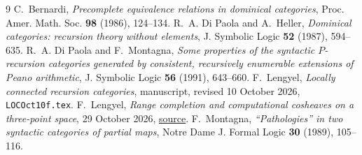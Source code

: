 \documentclass[11pt]{article}
\begin{document}
\begin{thebibliography}{9}
C.~Bernardi, \emph{Precomplete equivalence relations in dominical
categories}, Proc. Amer. Math. Soc. \textbf{98} (1986), 124--134.
R.~A. Di Paola and A.~Heller, \emph{Dominical categories:
recursion theory without elements}, J. Symbolic Logic
\textbf{52} (1987), 594--635.
R.~A. Di Paola and F.~Montagna, \emph{Some properties of the syntactic
$P$-recursion categories generated by consistent, recursively enumerable
extensions of Peano arithmetic}, J. Symbolic Logic \textbf{56} (1991),
643--660.
F.~Lengyel, \emph{Locally connected recursion categories}, manuscript,
revised 10 October 2026, \texttt{LOCOct10f.tex}.
F.~Lengyel, \emph{Range completion and computational cosheaves on a
three-point space}, 29 October 2026,
\href{https://github.com/flengyel/CategoricalEssentialIncompleteness/blob/3be65406b0bb6d3109a41fd3f517ca62fcc5ed8f/manuscript/range_completion_three_point_cosheaves.tex}{source}.
F.~Montagna, \emph{``Pathologies'' in two syntactic categories of partial
maps}, Notre Dame J. Formal Logic \textbf{30} (1989), 105--116.
\end{thebibliography}
\end{document}
